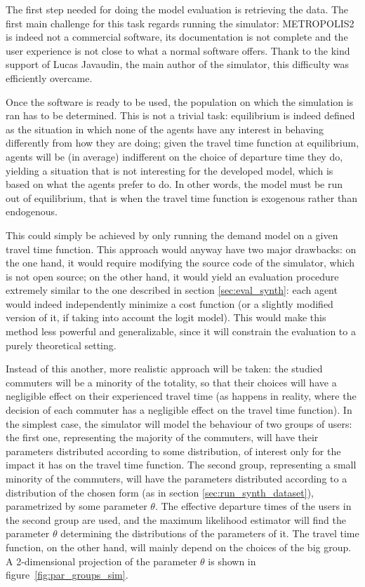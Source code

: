 The first step needed for doing the model evaluation is retrieving the data.
The first main challenge for this task regards running the simulator:
METROPOLIS2 is indeed not a commercial software,
its documentation is not complete and the user experience is not close to what a normal software offers.
Thank to the kind support of Lucas Javaudin,
the main author of the simulator, this difficulty was efficiently overcame.

Once the software is ready to be used,
the population on which the simulation is ran has to be determined.
This is not a trivial task:
equilibrium is indeed defined as the situation in which none of the agents have any interest in behaving differently from how they are doing;
given the travel time function at equilibrium,
agents will be (in average) indifferent on the choice of departure time they do,
yielding a situation that is not interesting for the developed model,
which is based on what the agents prefer to do.
In other words, the model must be run out of equilibrium, that is when the travel time function is exogenous rather than endogenous.

This could simply be achieved by only running the demand model on a given travel time function.
This approach would anyway have two major drawbacks:
on the one hand, it would require modifying the source code of the simulator,
which is not open source;
on the other hand, it would yield an evaluation procedure extremely similar to the one described in section \ref{sec:eval_synth}:
each agent would indeed independently minimize a cost function
(or a slightly modified version of it, if taking into account the logit model).
This would make this method less powerful and generalizable,
since it will constrain the evaluation to a purely theoretical setting.

Instead of this another, more realistic approach will be taken:
the studied commuters will be a minority of the totality,
so that their choices will have a negligible effect on their experienced travel time
(as happens in reality, where the decision of each commuter has a negligible effect on the travel time function).
In the simplest case, the simulator will model the behaviour of two groups of users:
the first one, representing the majority of the commuters,
will have their parameters distributed according to some distribution,
of interest only for the impact it has on the travel time function.
The second group, representing a small minority of the commuters,
will have the parameters distributed according to a distribution of the chosen form (as in section \ref{sec:run_synth_dataset}),
parametrized by some parameter \(\theta\).
The effective departure times of the users in the second group are used,
and the maximum likelihood estimator will find the parameter \(\theta\) determining the distributions of the parameters of it.
The travel time function, on the other hand,
will mainly depend on the choices of the big group.
A 2-dimensional projection of the parameter \(\theta\) is shown in figure~\ref{fig:par_groups_sim}.

